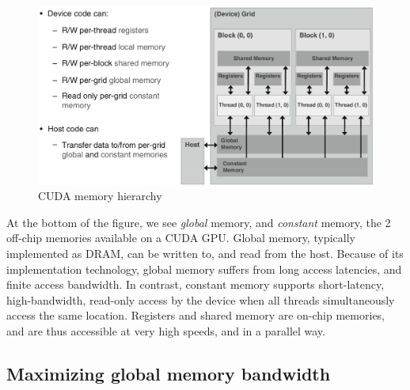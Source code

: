 \documentclass[10pt, a4paper]{report}
\begin{document}
\begin{figure}
\centering
\includegraphics[scale=0.25]{figs/cuda_memory_hierarchy}
\caption{CUDA memory hierarchy}
\label{fig:cuda_memory_hierarchy}
\end{figure}

At the bottom of the figure, we see \emph{global} memory, and \emph{constant}
memory, the 2 off-chip memories available on a CUDA GPU.
Global memory, typically implemented as DRAM, can be written to, and read from
the host.
Because of its implementation technology, global memory suffers from long access
latencies, and finite access bandwidth.
In contrast, constant memory supports short-latency, high-bandwidth, read-only
access by the device when all threads simultaneously access the same location.
Registers and shared memory are on-chip memories, and are thus accessible at
very high speeds, and in a parallel way.

\subsection{Maximizing global memory bandwidth}



\end{document}
